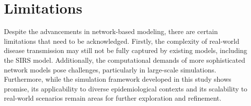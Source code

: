 \section{Limitations}
Despite the advancements in network-based modeling, there are certain limitations that need to be acknowledged. Firstly, the complexity of real-world disease transmission may still not be fully captured by existing models, including the SIRS model. Additionally, the computational demands of more sophisticated network models pose challenges, particularly in large-scale simulations. Furthermore, while the simulation framework developed in this study shows promise, its applicability to diverse epidemiological contexts and its scalability to real-world scenarios remain areas for further exploration and refinement.
